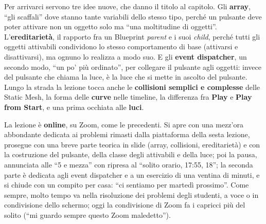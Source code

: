 Per arrivarci servono tre idee nuove, che danno il titolo al capitolo. Gli
\textbf{array}, ``gli scaffali'' dove stanno tante variabili dello stesso tipo, perché
un pulsante deve poter attivare non un oggetto solo ma ``una moltitudine di oggetti''.
L'\textbf{ereditarietà}, il rapporto fra un Blueprint \emph{parent} e i suoi
\emph{child}, perché tutti gli oggetti attivabili condividono lo stesso comportamento di
base (attivarsi e disattivarsi), ma ognuno lo realizza a modo suo. E gli \textbf{event
dispatcher}, un secondo modo, ``un po' più ordinato'', per collegare il pulsante agli
oggetti: invece del pulsante che chiama la luce, è la luce che si mette in ascolto del
pulsante. Lungo la strada la lezione tocca anche le \textbf{collisioni semplici e
complesse} delle Static Mesh, la forma delle \textbf{curve} nelle timeline, la
differenza fra \textbf{Play} e \textbf{Play from Start}, e una prima occhiata alle
\textbf{luci}.

La lezione è \textbf{online}, su Zoom, come le precedenti. Si apre con una mezz'ora
abbondante dedicata ai problemi rimasti dalla piattaforma della sesta lezione, prosegue
con una breve parte teorica in slide (array, collisioni, ereditarietà) e con la
costruzione del pulsante, della classe degli attivabili e della luce; poi la pausa,
annunciata alle ``5 e mezza'' con ripresa al ``solito orario, 17:55, 18''; la seconda
parte è dedicata agli event dispatcher e a un esercizio di una ventina di minuti, e si
chiude con un compito per casa: ``ci sentiamo per martedì prossimo''. Come sempre, molto
tempo va nella risoluzione dei problemi degli studenti, a voce o in condivisione dello
schermo; oggi la condivisione di Zoom fa i capricci più del solito (``mi guardo sempre
questo Zoom maledetto'').

